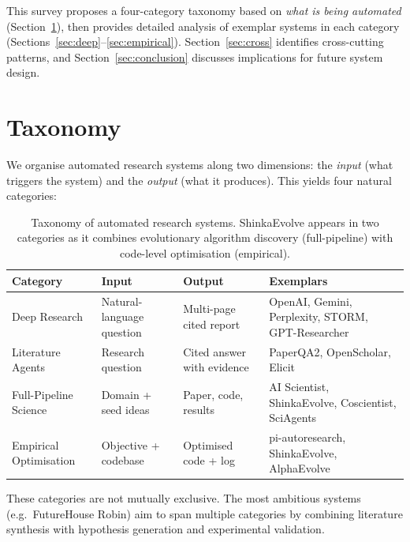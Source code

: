 \documentclass[11pt,a4paper]{article}
\begin{document}
This survey proposes a four-category taxonomy based on \emph{what is
being automated} (Section~\ref{sec:taxonomy}), then provides detailed
analysis of exemplar systems in each category
(Sections~\ref{sec:deep}--\ref{sec:empirical}). Section~\ref{sec:cross}
identifies cross-cutting patterns, and Section~\ref{sec:conclusion}
discusses implications for future system design.

\section{Taxonomy}
\label{sec:taxonomy}

We organise automated research systems along two dimensions: the
\emph{input} (what triggers the system) and the \emph{output} (what it
produces). This yields four natural categories:

\begin{table}[h]
\centering
\small
\begin{tabular}{@{}L{2.8cm}L{3.5cm}L{3.5cm}L{4cm}@{}}
\toprule
\textbf{Category} & \textbf{Input} & \textbf{Output} & \textbf{Exemplars} \\
\midrule
Deep Research & Natural-language question & Multi-page cited report &
  OpenAI, Gemini, Perplexity, STORM, GPT-Researcher \\[0.5em]
Literature Agents & Research question & Cited answer with evidence &
  PaperQA2, OpenScholar, Elicit \\[0.5em]
Full-Pipeline Science & Domain + seed ideas & Paper, code, results &
  AI Scientist, ShinkaEvolve, Coscientist, SciAgents \\[0.5em]
Empirical Optimisation & Objective + codebase & Optimised code + log &
  pi-autoresearch, ShinkaEvolve, AlphaEvolve \\
\bottomrule
\end{tabular}
\caption{Taxonomy of automated research systems. ShinkaEvolve appears
in two categories as it combines evolutionary algorithm discovery
(full-pipeline) with code-level optimisation (empirical).}
\label{tab:taxonomy}
\end{table}

\noindent
These categories are not mutually exclusive. The most ambitious systems
(e.g.\ FutureHouse Robin) aim to span multiple categories by combining
literature synthesis with hypothesis generation and experimental
validation.

\end{document}
